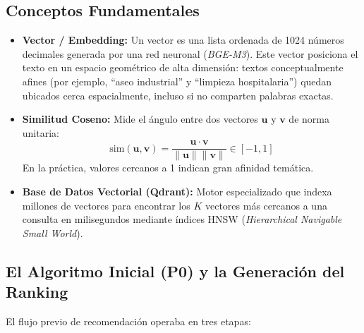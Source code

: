 \documentclass[11pt,a4paper]{article}
\begin{document}
\subsection{Conceptos Fundamentales}
\begin{itemize}[leftmargin=*]
    \item \textbf{Vector / Embedding:} Un vector es una lista ordenada de 1024 números decimales generada por una red neuronal (\textit{BGE-M3}). Este vector posiciona el texto en un espacio geométrico de alta dimensión: textos conceptualmente afines (por ejemplo, ``aseo industrial'' y ``limpieza hospitalaria'') quedan ubicados cerca espacialmente, incluso si no comparten palabras exactas.
    \item \textbf{Similitud Coseno:} Mide el ángulo entre dos vectores $\mathbf{u}$ y $\mathbf{v}$ de norma unitaria:
    \begin{equation}
        \text{sim}(\mathbf{u}, \mathbf{v}) = \frac{\mathbf{u} \cdot \mathbf{v}}{\|\mathbf{u}\| \|\mathbf{v}\|} \in [-1, 1]
    \end{equation}
    En la práctica, valores cercanos a 1 indican gran afinidad temática.
    \item \textbf{Base de Datos Vectorial (Qdrant):} Motor especializado que indexa millones de vectores para encontrar los $K$ vectores más cercanos a una consulta en milisegundos mediante índices HNSW (\textit{Hierarchical Navigable Small World}).
\end{itemize}

\subsection{El Algoritmo Inicial (P0) y la Generación del Ranking}
El flujo previo de recomendación operaba en tres etapas:
\end{document}
